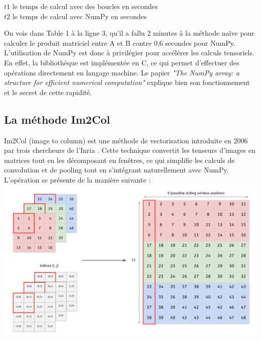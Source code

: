 \begin{multicols}{2}
{\scriptsize
$t1$ le temps de calcul avec des boucles en secondes\\
$t2$ le temps de calcul avec NumPy en secondes\\
}

On vois dans Table 1 à la ligne 3, qu'il a fallu 2 minutes à la méthode naïve pour calculer 
le produit matriciel entre A et B contre 0,6 secondes pour NumPy.\\

L’utilisation de NumPy est donc à privilégier pour accélérer les calculs tensoriels. 
En effet, la bibliothèque est implémentée en C, ce qui permet d'effectuer des
opérations directement en langage machine. Le papier \textit{"The NumPy array: a structure for efficient numerical computation"}\cite{NumPyEfficiency}
explique bien son fonctionnement et le secret de cette rapidité.

\subsection{La méthode Im2Col}

Im2Col (image to column) est une méthode de vectorisation introduite en 2006 par 
trois chercheurs de l’Inria \cite{im2col}. Cette technique convertit les tenseurs 
d’images en matrices tout en les décomposant en fenêtres, ce qui simplifie les calculs 
de convolution et de pooling tout en s’intégrant naturellement avec NumPy. \\

L'opération se présente de la manière suivante :\\

\includegraphics[width=\columnwidth]{images/im2col-1.png}
\hfill\break


\end{multicols}
